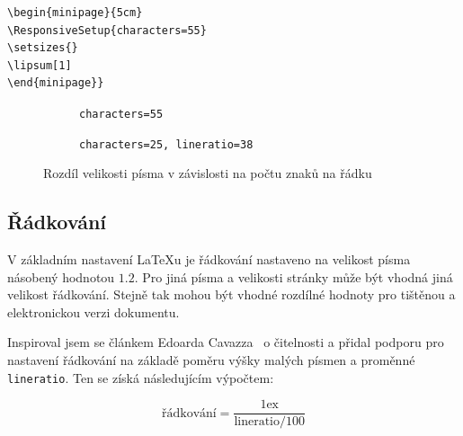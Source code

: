 \documentclass{csbulletin}
\begin{document}
\begin{verbatim}
\begin{minipage}{5cm}
\ResponsiveSetup{characters=55}
\setsizes{}
\lipsum[1]
\end{minipage}}
\end{verbatim}

\begin{figure}[tbp]
  \begin{subfigure}[t]{0.45\textwidth}
\caption{\texttt{characters=55}}
\end{subfigure}
\hfill
\begin{subfigure}[t]{0.45\textwidth}
\caption{\texttt{characters=25, lineratio=38}}
\end{subfigure}
  \caption{Rozdíl velikosti písma v závislosti na počtu znaků na řádku}\label{fig:fontsize}
\end{figure}

\subsection{Řádkování}

V základním nastavení \LaTeX u je řádkování nastaveno
na velikost písma násobený hodnotou $1.2$. Pro jiná 
písma a velikosti stránky může být vhodná jiná velikost řádkování.
Stejně tak mohou být vhodné rozdílné hodnoty pro tištěnou a elektronickou 
verzi dokumentu. 

Inspiroval jsem se článkem Edoarda Cavazza~\cite{cavazza} o čitelnosti
a přidal podporu pro nastavení řádkování na základě poměru výšky 
malých písmen a proměnné \texttt{lineratio}. Ten se získá následujícím 
výpočtem: 

\[\text{řádkování} = \frac{1\text{ex}}{\text{lineratio}/ 100}\]
\end{document}
